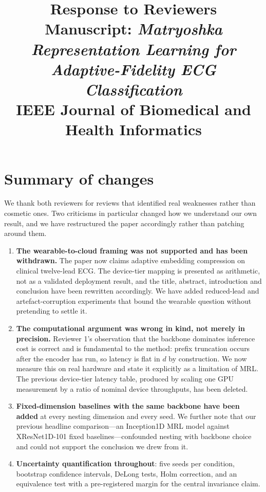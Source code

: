 \documentclass[11pt,a4paper]{article}
\title{\vspace{-2em}Response to Reviewers\\[0.3em]
\large Manuscript: \textit{Matryoshka Representation Learning for
Adaptive-Fidelity ECG Classification}\\
\normalsize IEEE Journal of Biomedical and Health Informatics}
\author{}
\date{}
\begin{document}
\maketitle
\vspace{-3em}

\section*{Summary of changes}

We thank both reviewers for reviews that identified real weaknesses rather
than cosmetic ones. Two criticisms in particular changed how we understand our
own result, and we have restructured the paper accordingly rather than
patching around them.

\begin{enumerate}[leftmargin=*,itemsep=3pt]
\item \textbf{The wearable-to-cloud framing was not supported and has been
withdrawn.} The paper now claims adaptive embedding compression on clinical
twelve-lead ECG. The device-tier mapping is presented as arithmetic, not as a
validated deployment result, and the title, abstract, introduction and
conclusion have been rewritten accordingly. We have added reduced-lead and
artefact-corruption experiments that bound the wearable question without
pretending to settle it.

\item \textbf{The computational argument was wrong in kind, not merely in
precision.} Reviewer 1's observation that the backbone dominates inference
cost is correct and is fundamental to the method: prefix truncation occurs
after the encoder has run, so latency is flat in $d$ by construction. We now
measure this on real hardware and state it explicitly as a limitation of MRL.
The previous device-tier latency table, produced by scaling one GPU
measurement by a ratio of nominal device throughputs, has been deleted.

\item \textbf{Fixed-dimension baselines with the same backbone have been
added} at every nesting dimension and every seed. We further note that our
previous headline comparison---an Inception1D MRL model against XResNet1D-101
fixed baselines---confounded nesting with backbone choice and could not
support the conclusion we drew from it.

\item \textbf{Uncertainty quantification throughout}: five seeds per
condition, bootstrap confidence intervals, DeLong tests, Holm correction, and
an equivalence test with a pre-registered margin for the central invariance
claim.


\end{enumerate}
\end{document}
